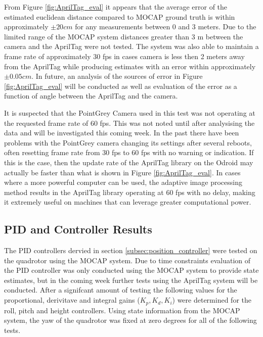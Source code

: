 \documentclass[11pt, twocolumn]{article}
\begin{document}
From Figure \ref{fig:AprilTag_eval} it appears that the average error of the estimated euclidean distance compared to MOCAP ground truth is within approximately $\pm 20 cm$ for any measurements between 0 and 3 meters. Due to the limited range of the MOCAP system distances greater than 3 m between the camera and the AprilTag were not tested. The system was also able to maintain a frame rate of approximately 30 fps in cases camera is less then 2 meters away from the AprilTag while producing estimates with an error within approximately $\pm 0.05 cm$. In future, an analysis of the sources of error in Figure \ref{fig:AprilTag_eval} will be conducted as well as evaluation of the error as a function of angle between the AprilTag and the camera. 

It is suspected that the PointGrey Camera used in this test was not operating at the requested frame rate of 60 fps. This was not noted until after analysising the data and will be investigated this coming week. In the past there have been problems with the PointGrey camera changing its settings after several reboots, often resetting frame rate from 30 fps to 60 fps with no warning or indication. If this is the case, then the update rate of the AprilTag library on the Odroid may actually be faster than what is shown in Figure \ref{fig:AprilTag_eval}. In cases where a more powerful computer can be used, the adaptive image processing method results in the AprilTag library operating at 60 fps with no delay, making it extremely useful on machines that can leverage greater computational power. 

\subsection{PID and Controller Results}
The PID controllers dervied in section \ref{subsec:position_controller} were tested on the quadrotor using the MOCAP system. Due to time constraints evaluation of the PID controller was only conducted using the MOCAP system to provide state estimates, but in the coming week further tests using the AprilTag system will be conducted. After a signifcant amount of testing the following values for the proportional, derivitave and integral gains ($K_p, K_d, K_i$) were determined for the roll, pitch and height controllers. Using state information from the MOCAP system, the yaw of the quadrotor was fixed at zero degrees for all of the following tests. 
\end{document}
